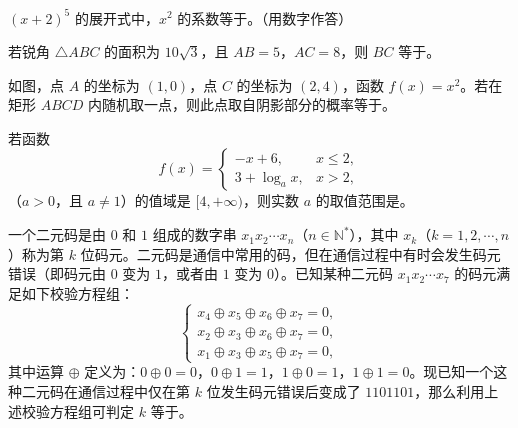 \begin{question}
$(x+2)^5$ 的展开式中，$x^2$ 的系数等于\gkblank{}。（用数字作答）

\end{question}
\begin{question}
若锐角 $\triangle ABC$ 的面积为 $10\sqrt3$，且 $AB=5$，$AC=8$，则 $BC$ 等于\gkblank{}。

\Needspace{0.4\textheight}
\end{question}
\begin{question}
如图，点 $A$ 的坐标为 $(1,0)$，点 $C$ 的坐标为 $(2,4)$，函数 $f(x)=x^2$。若在矩形 $ABCD$ 内随机取一点，则此点取自阴影部分的概率等于\gkblank{}。
\nopagebreak[4]
\begin{center}\end{center}
\nopagebreak[4]
\end{question}
\begin{question}
若函数
\nopagebreak[4]
\[
f(x)=\begin{cases}
-x+6,&x\leqslant2,\\
3+\log_a x,&x>2,
\end{cases}
\]
（$a>0$，且 $a\ne1$）的值域是 $[4,+\infty)$，则实数 $a$ 的取值范围是\gkblank{}。

\end{question}
\begin{question}
一个二元码是由 $0$ 和 $1$ 组成的数字串 $x_1x_2\cdots x_n$（$n\in\mathbb{N}^*$），其中 $x_k$（$k=1,2,\cdots,n$）称为第 $k$ 位码元。二元码是通信中常用的码，但在通信过程中有时会发生码元错误（即码元由 $0$ 变为 $1$，或者由 $1$ 变为 $0$）。已知某种二元码 $x_1x_2\cdots x_7$ 的码元满足如下校验方程组：
\nopagebreak[4]
\[
\begin{cases}
x_4\oplus x_5\oplus x_6\oplus x_7=0,\\
x_2\oplus x_3\oplus x_6\oplus x_7=0,\\
x_1\oplus x_3\oplus x_5\oplus x_7=0,
\end{cases}
\]
其中运算 $\oplus$ 定义为：$0\oplus0=0$，$0\oplus1=1$，$1\oplus0=1$，$1\oplus1=0$。现已知一个这种二元码在通信过程中仅在第 $k$ 位发生码元错误后变成了 $1101101$，那么利用上述校验方程组可判定 $k$ 等于\gkblank{}。

\end{question}

